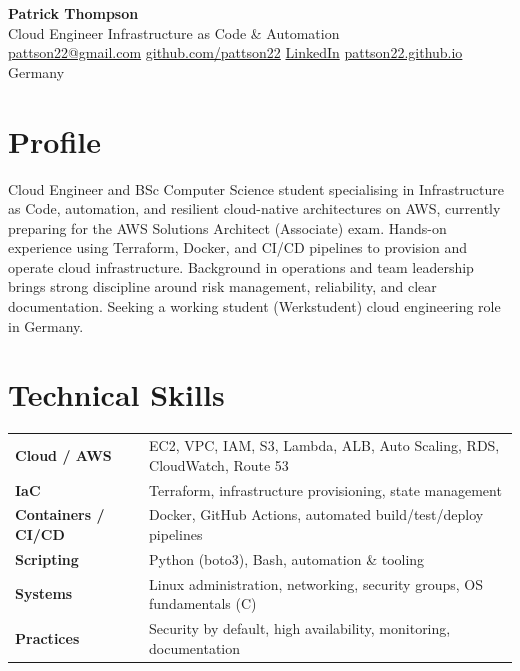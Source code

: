 \documentclass[11pt,a4paper]{article}
\begin{document}
\begin{center}
  {\Huge \bfseries \color{ink} Patrick Thompson}\\[4pt]
  {\large \color{awsorange} Cloud Engineer \textbar{} Infrastructure as Code \& Automation}\\[6pt]
  \small
  \href{mailto:pattson22@gmail.com}{pattson22@gmail.com} \quad
  \href{https://github.com/pattson22}{github.com/pattson22} \quad
  \href{https://linkedin.com/in/patrick-thompson-fintech/}{LinkedIn} \quad
  \href{https://pattson22.github.io}{pattson22.github.io}\\
  Germany
\end{center}

\section{Profile}
Cloud Engineer and BSc Computer Science student specialising in Infrastructure
as Code, automation, and resilient cloud-native architectures on AWS, currently
preparing for the AWS Solutions Architect (Associate) exam. Hands-on experience
using Terraform, Docker, and CI/CD pipelines to provision and operate cloud
infrastructure. Background in operations and team leadership
brings strong discipline around risk management, reliability, and clear
documentation. Seeking a working student (Werkstudent) cloud engineering role
in Germany.

\section{Technical Skills}
\begin{tabular}{@{}p{3.2cm}p{14cm}@{}}
\textbf{Cloud / AWS} & EC2, VPC, IAM, S3, Lambda, ALB, Auto Scaling, RDS, CloudWatch, Route 53 \\[3pt]
\textbf{IaC} & Terraform, infrastructure provisioning, state management \\[3pt]
\textbf{Containers / CI/CD} & Docker, GitHub Actions, automated build/test/deploy pipelines \\[3pt]
\textbf{Scripting} & Python (boto3), Bash, automation \& tooling \\[3pt]
\textbf{Systems} & Linux administration, networking, security groups, OS fundamentals (C) \\[3pt]
\textbf{Practices} & Security by default, high availability, monitoring, documentation \\
\end{tabular}
\end{document}
